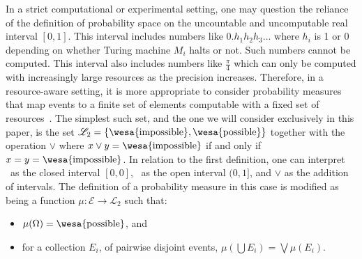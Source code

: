 \documentclass{article}
\theoremstyle{remark}
\newcommand{\events}{\ensuremath{\mathcal{E}}}
\newcommand{\pmeas}{\ensuremath{\mu}}
\newcommand{\poss}{{\mbox{\wesa{possible}}}}
\newcommand{\imposs}{{\mbox{\wesa{impossible}}}}
\begin{document}
In a strict computational or experimental setting, one may question
the reliance of the definition of probability space on the uncountable
and uncomputable real interval $[0,1]$. This interval includes numbers
like $0.h_1h_2h_3\ldots$ where $h_i$ is 1 or 0 depending on whether
Turing machine $M_i$ halts or not. Such numbers cannot be
computed. This interval also includes numbers like $\frac{\pi}{4}$
which can only be computed with increasingly large resources as the
precision increases. Therefore, in a resource-aware setting, it is
more appropriate to consider probability measures that map events to a
finite set of elements computable with a fixed set of
resources~\cite{Artstein1972,PuriRalescu1983}. The simplest such set,
and the one we will consider exclusively in this paper, is the set
$\mathscr{L}_{2}=\left\{ \imposs, \poss\right\}$ together with the
operation $\vee$ where $x \vee y=\imposs$ if and only if
$x=y=\imposs$. In relation to the first definition, one can interpret
\imposs\ as the closed interval $[0,0]$, \poss\ as the open interval
$(0,1]$, and $\vee$ as the addition of intervals. The definition of a
probability measure in this case is modified as being a function
$\pmeas : \events \rightarrow \mathscr{L}_{2}$ such that:
\begin{itemize}
\item $\pmeas(\Omega) = \poss$, and
\item for a collection $E_i$,  of pairwise disjoint events, $\pmeas(\bigcup E_i) = \bigvee \pmeas(E_i)$.
\end{itemize}
\end{document}
